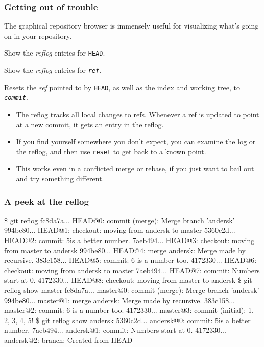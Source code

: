 \documentclass{beamer}
\makeatletter
\newcommand{\sh}[1]{\$ {\color{beamer@blendedblue}#1}}
\makeatother
\begin{document}
\begin{frame}
  \frametitle{Getting out of trouble}
  \begin{description}
  \item[\texttt{gitk --all}\hfill] The graphical repository browser is
    immensely useful for visualizing what's going on in your
    repository.
  \item[\texttt{git reflog}\hfill] Show the \emph{reflog} entries for
    \texttt{HEAD}.
  \item[\texttt{git reflog show \textit{ref}}\hfill] Show the
    \emph{reflog} entries for \texttt{\textit{ref}}.
  \item[\texttt{git reset --hard \textit{commit}}\hfill] Resets the
    \emph{ref} pointed to by \texttt{HEAD}, as well as the index and
    working tree, to \texttt{\textit{commit}}.
  \end{description}

  \begin{itemize}
  \item The reflog tracks all local changes to refs.  Whenever a ref
    is updated to point at a new commit, it gets an entry in the
    reflog.
  \item If you find yourself somewhere you don't expect, you can
    examine the log or the reflog, and then use \texttt{reset} to get
    back to a known point.
  \item This works even in a conflicted merge or rebase, if you just
    want to bail out and try something different.
  \end{itemize}

\end{frame}

\begin{frame}[fragile]
  \frametitle{A peek at the reflog}
  {\footnotesize
  \begin{semiverbatim}
\sh{git reflog}
{\color{olive}fc8da7a...} HEAD@{0}: commit (merge): Merge branch 'andersk'
{\color{olive}994be80...} HEAD@{1}: checkout: moving from andersk to master
{\color{olive}5360c2d...} HEAD@{2}: commit: 5\textonehalf is a better number.
{\color{olive}7aeb494...} HEAD@{3}: checkout: moving from master to andersk
{\color{olive}994be80...} HEAD@{4}: merge andersk: Merge made by recursive.
{\color{olive}383c158...} HEAD@{5}: commit: 6 is a number too.
{\color{olive}4172330...} HEAD@{6}: checkout: moving from andersk to master
{\color{olive}7aeb494...} HEAD@{7}: commit: Numbers start at 0.
{\color{olive}4172330...} HEAD@{8}: checkout: moving from master to andersk
\sh{git reflog show master}
{\color{olive}fc8da7a...} master@{0}: commit (merge): Merge branch 'andersk'
{\color{olive}994be80...} master@{1}: merge andersk: Merge made by recursive.
{\color{olive}383c158...} master@{2}: commit: 6 is a number too.
{\color{olive}4172330...} master@{3}: commit (initial): 1, 2, 3, 4, 5!
\sh{git reflog show andersk}
{\color{olive}5360c2d...} andersk@{0}: commit: 5\textonehalf is a better number.
{\color{olive}7aeb494...} andersk@{1}: commit: Numbers start at 0.
{\color{olive}4172330...} andersk@{2}: branch: Created from HEAD
  \end{semiverbatim}}
\end{frame}
\end{document}
